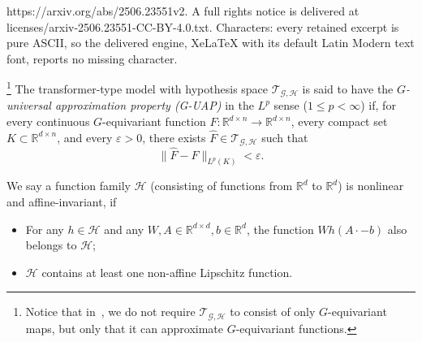 \documentclass[10pt,a4paper]{amsart}
\begin{document}
https://arxiv.org/abs/2506.23551v2. A full rights notice is delivered at licenses/arxiv-2506.23551-CC-BY-4.0.txt. Characters: every retained excerpt is pure ASCII, so the delivered engine, XeLaTeX with its default Latin Modern text font, reports no missing character.
\begin{definition}[$G$-UAP]\footnote{Notice that in~, we do not require $\mathcal T_{\mathcal G,\mathcal H}$ to consist of only $G$-equivariant maps, but only that it can approximate $G$-equivariant functions. }
    \label{def:G-UAP}
    The transformer-type model with hypothesis space $\mathcal{T}_{\mathcal{G},\mathcal{H}}$ is said to have the \emph{$G$-universal approximation property (G-UAP)} in the $L^p$ sense ($1\le p<\infty$) if, for every continuous $G$-equivariant function $F:\mathbb R^{d\times n}\to\mathbb{R}^{d\times n}$, every compact set $K\subset\mathbb R^{d\times n}$, and every $\varepsilon>0$, there exists $\hat{F}\in\mathcal{T}_{\mathcal{G},\mathcal{H}}$ such that
    \begin{equation}
        \|\hat{F}-F\|_{L^p(K)}<\varepsilon.
    \end{equation}
\end{definition}

\begin{definition}
    \label{def:nonlinearity}
    We say a function family $\mathcal H$ (consisting of functions from $\mathbb{R}^d$ to $\mathbb{R}^d$) is nonlinear and affine-invariant, if 
    \begin{itemize}
        \item For any $h\in \mathcal{H}$ and any $W, A\in \mathbb{R}^{d\times d}, b\in \mathbb{R}^d$, the function $Wh(A\cdot -b)$ also belongs to ${\mathcal{H}}$;
        \item  $\mathcal{H}$ contains at least one non-affine Lipschitz function.
    \end{itemize}
\end{definition}
\end{document}
